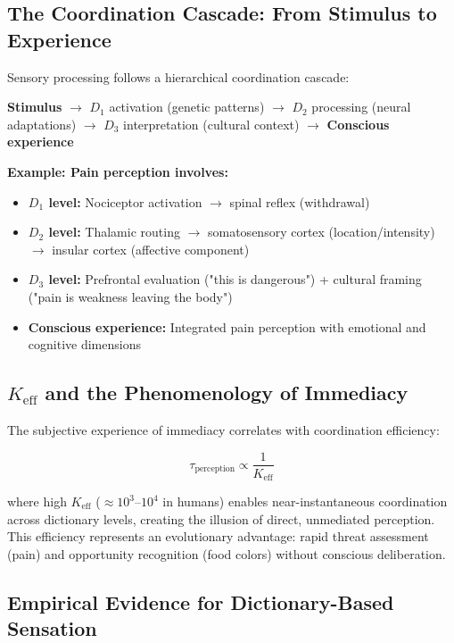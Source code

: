 \documentclass[12pt,a4paper]{article}
\newcommand{\eff}{\mathrm{eff}}
\newcommand{\Ke}{K_{\eff}}
\begin{document}
	\subsection{The Coordination Cascade: From Stimulus to Experience}
	
	Sensory processing follows a hierarchical coordination cascade:
	
	\begin{center}
		\textbf{Stimulus} $\rightarrow$ $D_1$ activation (genetic patterns) $\rightarrow$ $D_2$ processing (neural adaptations) $\rightarrow$ $D_3$ interpretation (cultural context) $\rightarrow$ \textbf{Conscious experience}
	\end{center}
	
	\textbf{Example: Pain perception involves:}
	\begin{itemize}
		\item \textbf{$D_1$ level:} Nociceptor activation $\rightarrow$ spinal reflex (withdrawal)
		\item \textbf{$D_2$ level:} Thalamic routing $\rightarrow$ somatosensory cortex (location/intensity) $\rightarrow$ insular cortex (affective component)
		\item \textbf{$D_3$ level:} Prefrontal evaluation ("this is dangerous") + cultural framing ("pain is weakness leaving the body")
		\item \textbf{Conscious experience:} Integrated pain perception with emotional and cognitive dimensions
	\end{itemize}
	
	\subsection{$\Ke$ and the Phenomenology of Immediacy}
	
	The subjective experience of immediacy correlates with coordination efficiency:
	
	\[
	\tau_{\text{perception}} \propto \frac{1}{\Ke}
	\]
	
	where high $\Ke$ ($\approx 10^3$–$10^4$ in humans) enables near-instantaneous coordination across dictionary levels, creating the illusion of direct, unmediated perception. This efficiency represents an evolutionary advantage: rapid threat assessment (pain) and opportunity recognition (food colors) without conscious deliberation.
	
	\subsection{Empirical Evidence for Dictionary-Based Sensation}
	
\end{document}
